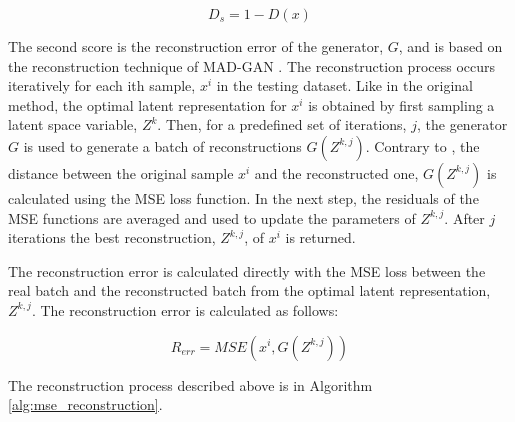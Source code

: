 \begin{equation}
    D_{s} = 1 - D(x)
\end{equation}

The second score is the reconstruction error of the generator, $G$, and is based on the reconstruction technique of MAD-GAN \cite{li.etal_MADGANMultivariateAnomaly_2019}. The reconstruction process occurs iteratively for each ith sample, $x^i$ in the testing dataset. Like in the original method, the optimal latent representation for $x^i$ is obtained by first sampling a latent space variable, $Z^k$. Then, for a predefined set of iterations, $j$, the generator $G$ is used to generate a batch of reconstructions $G(Z^{k,j})$. Contrary to \cite{li.etal_MADGANMultivariateAnomaly_2019}, the distance between the original sample $x^i$ and the reconstructed 
one, $G(Z^{k,j})$ is calculated using the MSE loss function. In the next step, the residuals of the MSE functions are averaged and used to update the parameters of $Z^{k,j}$. After $j$ iterations the best reconstruction, $Z^{k,j}$, of $x^i$ is returned.

The reconstruction error is calculated directly with the MSE loss between the real batch and the reconstructed batch from the optimal latent representation, $Z^{k,j}$. The reconstruction error is calculated as follows:

\begin{equation}
    R_{err} = MSE(x^i, G(Z^{k,j}))
\end{equation}

The reconstruction process described above is in Algorithm \ref{alg:mse_reconstruction}.
\\

\noindent{}

